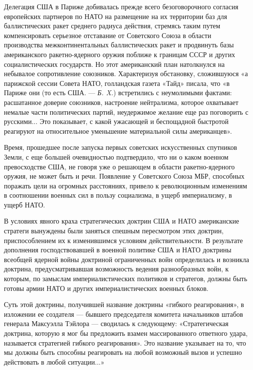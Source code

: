 \documentclass[12pt, a4paper, openany]{book}
\begin{document}
		Делегация США в Париже добивалась прежде всего безоговорочного согласия европейских партнеров по НАТО на размещение на их территории баз для баллистических ракет среднего радиуса действия, стремясь таким путем компенсировать серьезное отставание от Советского Союза в области производства межконтинентальных баллистических ракет и продвинуть базы американского ракетно-ядерного оружия поближе к границам СССР и других социалистических государств. Но этот американский план натолкнулся на небывалое сопротивление союзников. Характеризуя обстановку, сложившуюся «а парижской сессии Совета НАТО, голландская газета «Тайд» писала, что «в Париже они (то есть США. — \textit{Б. X.}) встретились с неумолимыми фактами: расшатанное доверие союзников, настроение нейтрализма, которое охватывает немалые части политических партий, неудержимое желание еще раз поговорить с русскими... Это показывает, с какой ужасающей и беспощадной быстротой реагируют на относительное уменьшение материальной силы американцев».
		
		Время, прошедшее после запуска первых советских искусственных спутников Земли, с еще большей очевидностью подтвердило, что ни о каком военном превосходстве США, не говоря уже о решающем в области ракетно-ядерного оружия, не может быть и речи.
		Появление у Советского Союза МБР, способных поражать цели на огромных расстояниях, привело к революционным изменениям в соотношении военных сил в пользу социализма, в ущерб империализму, в ущерб НАТО.
		
		В условиях явного краха стратегических доктрин США и НАТО американские стратеги вынуждены были заняться спешным пересмотром этих доктрин, приспособлением их к изменившимся условиям действительности. В результате дополнения господствовавшей в военной политике США и НАТО доктрины всеобщей ядерной войны доктриной ограниченных войн определилась и возникла доктрина, предусматривавшая возможность ведения разнообразных войн, к которым, по замыслам империалистических политиков и стратегов, должны быть готовы армии НАТО и других империалистических военных блоков.
		
		Суть этой доктрины, получившей название доктрины «гибкого реагирования», в изложении ее создателя — бывшего председателя комитета начальников штабов генерала Максуэлла Тэйлора — сводилась к следующему: «Стратегическая доктрина, которую я мог бы предложить взамен массированного ответного удара, называется стратегией гибкого реагирования». Это название указывает на то, что мы должны быть способны реагировать на любой возможный вызов и успешно действовать в любой ситуации...»
		
\end{document}
